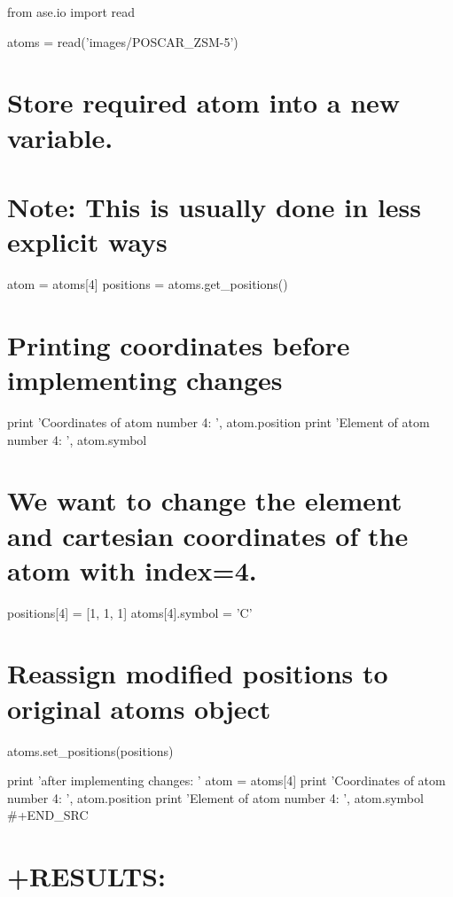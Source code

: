 \documentclass[11pt]{article}
\begin{document}
from ase.io import read

atoms = read('images/POSCAR\_ZSM-5')

\section{Store required atom into a new
variable.}\label{store-required-atom-into-a-new-variable.}

\section{Note: This is usually done in less explicit
ways}\label{note-this-is-usually-done-in-less-explicit-ways}

atom = atoms{[}4{]} positions = atoms.get\_positions()

\section{Printing coordinates before implementing
changes}\label{printing-coordinates-before-implementing-changes}

print 'Coordinates of atom number 4: ', atom.position print 'Element of
atom number 4: ', atom.symbol

\section{We want to change the element and cartesian coordinates of the
atom with
index=4.}\label{we-want-to-change-the-element-and-cartesian-coordinates-of-the-atom-with-index4.}

positions{[}4{]} = {[}1, 1, 1{]} atoms{[}4{]}.symbol = 'C'

\section{Reassign modified positions to original atoms
object}\label{reassign-modified-positions-to-original-atoms-object}

atoms.set\_positions(positions)

print '\nDetails after implementing changes: ' atom = atoms{[}4{]} print
'Coordinates of atom number 4: ', atom.position print 'Element of atom
number 4: ', atom.symbol \#+END\_SRC

\section{+RESULTS:}\label{results-13}
\end{document}
